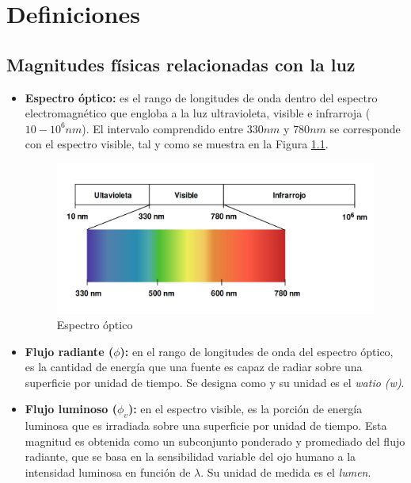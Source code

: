 \documentclass[a4paper, 12pt]{report}
\begin{document}
\chapter{Definiciones}
\label{app:definiciones}

\section{Magnitudes físicas relacionadas con la luz}
\label{sec:fisica_luz}

\begin{itemize}
    \item \textbf{Espectro óptico: } es el rango de longitudes de onda dentro del espectro electromagnético que engloba a la luz ultravioleta, visible e infrarroja ({\footnotesize $10-10^{6} nm$}). El intervalo comprendido entre {\footnotesize $330 nm$} y {\footnotesize $780 nm$} se corresponde con el espectro visible, tal y como se muestra en la Figura \ref{fig:visible_spectrum}.

\begin{figure}[H]
    \centering
    \includegraphics[width=11cm, keepaspectratio]{img/APENDICES/B/optic_spectrum.png}
    \caption{Espectro óptico}
    \label{fig:visible_spectrum}
\end{figure}
    
    \item \textbf{Flujo radiante {\footnotesize ($\phi$)}:} en el rango de longitudes de onda del espectro óptico, es la cantidad de energía que una fuente es capaz de radiar sobre una superficie por unidad de tiempo. Se designa como y su unidad es el \textit{watio (w)}.
    
    \item \textbf{Flujo luminoso {\footnotesize ($\phi_{v}$}):} en el espectro visible, es la porción de energía luminosa que es irradiada sobre una superficie por unidad de tiempo. Esta magnitud es obtenida como un subconjunto ponderado y promediado del flujo radiante, que se basa en la sensibilidad variable del ojo humano a la intensidad luminosa en función de {\footnotesize $\lambda$}. Su unidad de medida es el \textit{lumen}.
    

\end{itemize}
\end{document}
